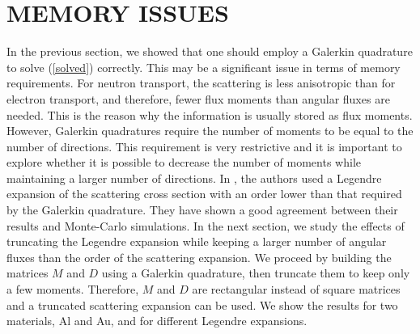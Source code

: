 \section{MEMORY ISSUES}
In the previous section, we showed that one should employ a Galerkin quadrature to solve
(\ref{solved}) correctly. This may be a significant issue in terms of memory
requirements. For neutron transport, the scattering is less anisotropic than 
for electron transport, and therefore, fewer flux moments than angular 
fluxes are needed. This is the reason why the information is usually stored as 
flux moments. However, Galerkin quadratures require the number of moments 
to be equal to the number of directions. This requirement is very restrictive and it 
is important to explore whether it is possible to decrease the number of moments 
while maintaining a larger number of directions. In \cite{mem}, the authors used a 
Legendre expansion of the scattering cross section with an order lower than that required by the 
Galerkin quadrature. They have shown a good agreement between their results 
and Monte-Carlo simulations. In the next section, we study the effects of
truncating the Legendre expansion while keeping a larger number of angular 
fluxes than the order of the scattering expansion. We proceed by building 
the matrices $M$ and $D$ using a Galerkin quadrature, then truncate them 
to keep only a few moments. Therefore, $M$ and $D$ are rectangular instead 
of square matrices and a truncated scattering expansion can be used. 
We show the results for two materials, Al and Au, and for different Legendre 
expansions.
